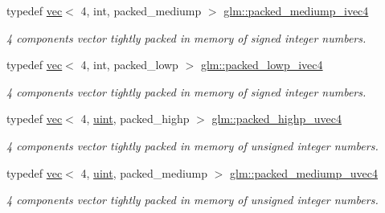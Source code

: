 \begin{DoxyCompactItemize}
\mbox{\label{group__gtc__type__aligned_gaea233dbda2d6eccdc4b72178eea9430f}} 
typedef \hyperlink{structglm_1_1vec}{vec}$<$ 4, int, packed\+\_\+mediump $>$ \hyperlink{group__gtc__type__aligned_gaea233dbda2d6eccdc4b72178eea9430f}{glm\+::packed\+\_\+mediump\+\_\+ivec4}
\begin{DoxyCompactList}\small\item\em 4 components vector tightly packed in memory of signed integer numbers. \end{DoxyCompactList}\item 
\mbox{\label{group__gtc__type__aligned_ga4f09d3093b0d71b2348a5a680f6badbd}} 
typedef \hyperlink{structglm_1_1vec}{vec}$<$ 4, int, packed\+\_\+lowp $>$ \hyperlink{group__gtc__type__aligned_ga4f09d3093b0d71b2348a5a680f6badbd}{glm\+::packed\+\_\+lowp\+\_\+ivec4}
\begin{DoxyCompactList}\small\item\em 4 components vector tightly packed in memory of signed integer numbers. \end{DoxyCompactList}\item 
\mbox{\label{group__gtc__type__aligned_ga769bab317264c023f8ee77897e4b5894}} 
typedef \hyperlink{structglm_1_1vec}{vec}$<$ 4, \hyperlink{group__core__precision_ga4fd29415871152bfb5abd588334147c8}{uint}, packed\+\_\+highp $>$ \hyperlink{group__gtc__type__aligned_ga769bab317264c023f8ee77897e4b5894}{glm\+::packed\+\_\+highp\+\_\+uvec4}
\begin{DoxyCompactList}\small\item\em 4 components vector tightly packed in memory of unsigned integer numbers. \end{DoxyCompactList}\item 
\mbox{\label{group__gtc__type__aligned_ga228b9899ea277eb8655d01c754e1ee64}} 
typedef \hyperlink{structglm_1_1vec}{vec}$<$ 4, \hyperlink{group__core__precision_ga4fd29415871152bfb5abd588334147c8}{uint}, packed\+\_\+mediump $>$ \hyperlink{group__gtc__type__aligned_ga228b9899ea277eb8655d01c754e1ee64}{glm\+::packed\+\_\+mediump\+\_\+uvec4}
\begin{DoxyCompactList}\small\item\em 4 components vector tightly packed in memory of unsigned integer numbers. \end{DoxyCompactList}\item 

\end{DoxyCompactItemize}
